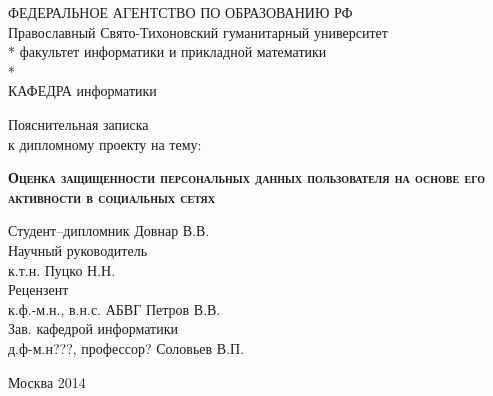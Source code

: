 \begin{titlepage}
\newpage
\begin{center}
ФЕДЕРАЛЬНОЕ АГЕНТСТВО ПО ОБРАЗОВАНИЮ РФ \\
\vspace{1cm}
Православный Свято-Тихоновский гуманитарный университет \\*
факультет информатики и прикладной математики\\*
\hrulefill \\
КАФЕДРА информатики
\end{center}

\vspace{8em}

\begin{center}
\Large Пояснительная записка \\ к дипломному проекту на тему:
\end{center}

\vspace{2.5em}

\begin{center}
\textsc{\textbf{Оценка защищенности персональных данных пользователя на основе его активности в социальных сетях}}
\end{center}

\vspace{6em}

\begin{flushleft}
Студент--дипломник \hrulefill Довнар В.В.\\
\vspace{1.5em}
Научный руководитель \\
к.т.н. \hrulefill Пуцко Н.Н.\\
\vspace{1.5em}
Рецензент \\
к.ф.-м.н., в.н.с. АБВГ \hrulefill Петров В.В.\\
\vspace{1.5em}
Зав. кафедрой информатики\\
д.ф-м.н???, профессор? \hrulefill Соловьев В.П.
\end{flushleft}

\vspace{\fill}

\begin{center}
Москва 2014
\end{center}
\end{titlepage}